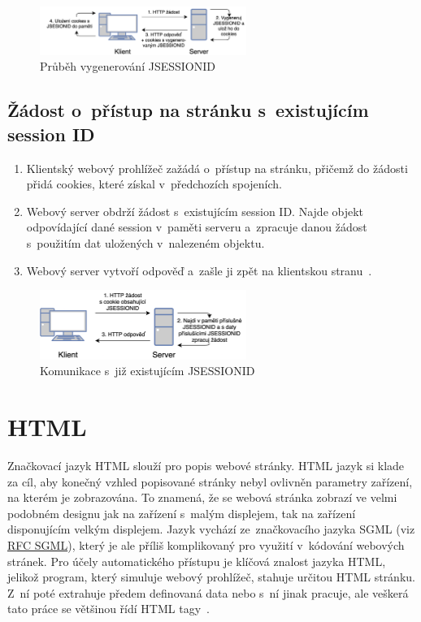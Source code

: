\begin{figure}[hbt]
	\centering
	\includegraphics[width=0.6\textwidth]{images/cookie.png}
	\caption{Průběh vygenerování JSESSIONID}
	\label{img:session_ID_generate}
\end{figure}

\subsection*{Žádost o~přístup na stránku s~existujícím session ID}
\begin{enumerate}
  \item Klientský webový prohlížeč zažádá o~přístup na stránku, přičemž do žádosti přidá cookies, které získal v~předchozích spojeních.
  \item Webový server obdrží žádost s~existujícím session ID. Najde objekt odpovídající dané session v~paměti serveru a~zpracuje danou žádost s~použitím dat uložených v~nalezeném objektu.
  \item Webový server vytvoří odpověď a~zašle ji zpět na klientskou stranu~\cite{bib:session_connection}.
\end{enumerate}

\begin{figure}[hbt]
	\centering
	\includegraphics[width=0.6\textwidth]{images/cookie_repeat.png}
	\caption{Komunikace s~již existujícím JSESSIONID}
	\label{img:session_ID_created}
\end{figure}


\section{HTML}
\label{sec:html}
Značkovací jazyk HTML slouží pro popis webové stránky. HTML jazyk si klade za cíl, aby konečný vzhled popisované stránky nebyl ovlivněn parametry zařízení, na kterém je zobrazována. To znamená, že se webová stránka zobrazí ve velmi podobném designu jak na zařízení s~malým displejem, tak na zařízení disponujícím velkým displejem. Jazyk vychází ze~značkovacího jazyka SGML (viz \href{https://tools.ietf.org/html/rfc1874}{RFC SGML}), který je ale příliš komplikovaný pro využití v~kódování webových stránek. Pro účely automatického přístupu je klíčová znalost jazyka HTML, jelikož program, který simuluje webový prohlížeč, stahuje určitou HTML stránku. Z~ní poté extrahuje předem definovaná data nebo s~ní jinak pracuje, ale veškerá tato práce se většinou řídí HTML tagy~\cite{bib:htmlRFC}.

